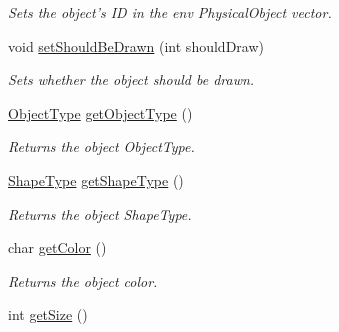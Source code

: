 \begin{DoxyCompactItemize}
\begin{DoxyCompactList}\small\item\em Sets the object's I\-D in the env Physical\-Object vector. \end{DoxyCompactList}\item 
void \hyperlink{classPhysicalObjectClass_ad56b454a01bad12ce620a15294ea3342}{set\-Should\-Be\-Drawn} (int should\-Draw)
\begin{DoxyCompactList}\small\item\em Sets whether the object should be drawn. \end{DoxyCompactList}\item 
\hypertarget{classPhysicalObjectClass_a22607bc441c1f2eb12ac515dfcae7727}{\hyperlink{PhysicalObjectClass_8h_a842c5e2e69277690b064bf363c017980}{Object\-Type} \hyperlink{classPhysicalObjectClass_a22607bc441c1f2eb12ac515dfcae7727}{get\-Object\-Type} ()}\label{classPhysicalObjectClass_a22607bc441c1f2eb12ac515dfcae7727}

\begin{DoxyCompactList}\small\item\em Returns the object Object\-Type. \end{DoxyCompactList}\item 
\hypertarget{classPhysicalObjectClass_a1fc5666bd712e7ee6f81f2ac29ac6e7f}{\hyperlink{PhysicalObjectClass_8h_a5a4538eeab397888d88a4eefcc5a1345}{Shape\-Type} \hyperlink{classPhysicalObjectClass_a1fc5666bd712e7ee6f81f2ac29ac6e7f}{get\-Shape\-Type} ()}\label{classPhysicalObjectClass_a1fc5666bd712e7ee6f81f2ac29ac6e7f}

\begin{DoxyCompactList}\small\item\em Returns the object Shape\-Type. \end{DoxyCompactList}\item 
\hypertarget{classPhysicalObjectClass_aa77678e94120c33115c1ca0ab7c3b303}{char \hyperlink{classPhysicalObjectClass_aa77678e94120c33115c1ca0ab7c3b303}{get\-Color} ()}\label{classPhysicalObjectClass_aa77678e94120c33115c1ca0ab7c3b303}

\begin{DoxyCompactList}\small\item\em Returns the object color. \end{DoxyCompactList}\item 
\hypertarget{classPhysicalObjectClass_a62dbe5239eb47623576e492001c9103c}{int \hyperlink{classPhysicalObjectClass_a62dbe5239eb47623576e492001c9103c}{get\-Size} ()}\label{classPhysicalObjectClass_a62dbe5239eb47623576e492001c9103c}


\end{DoxyCompactItemize}
